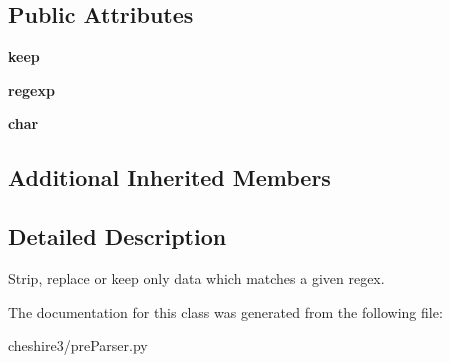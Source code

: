 \subsection*{Public Attributes}
\begin{DoxyCompactItemize}
\item 
\hypertarget{classcheshire3_1_1pre_parser_1_1_regexp_smash_pre_parser_a5d8838f60062927cdf93ebb1dabe7a81}{{\bfseries keep}}\label{classcheshire3_1_1pre_parser_1_1_regexp_smash_pre_parser_a5d8838f60062927cdf93ebb1dabe7a81}

\item 
\hypertarget{classcheshire3_1_1pre_parser_1_1_regexp_smash_pre_parser_abc44eee47e612b7c6c69fbf63decc5ec}{{\bfseries regexp}}\label{classcheshire3_1_1pre_parser_1_1_regexp_smash_pre_parser_abc44eee47e612b7c6c69fbf63decc5ec}

\item 
\hypertarget{classcheshire3_1_1pre_parser_1_1_regexp_smash_pre_parser_a2db0e68e886f0b5bc121685dbd3f7ecf}{{\bfseries char}}\label{classcheshire3_1_1pre_parser_1_1_regexp_smash_pre_parser_a2db0e68e886f0b5bc121685dbd3f7ecf}

\end{DoxyCompactItemize}
\subsection*{Additional Inherited Members}


\subsection{Detailed Description}
\begin{DoxyVerb}Strip, replace or keep only data which matches a given regex.\end{DoxyVerb}
 

The documentation for this class was generated from the following file\-:\begin{DoxyCompactItemize}
\item 
cheshire3/pre\-Parser.\-py\end{DoxyCompactItemize}
